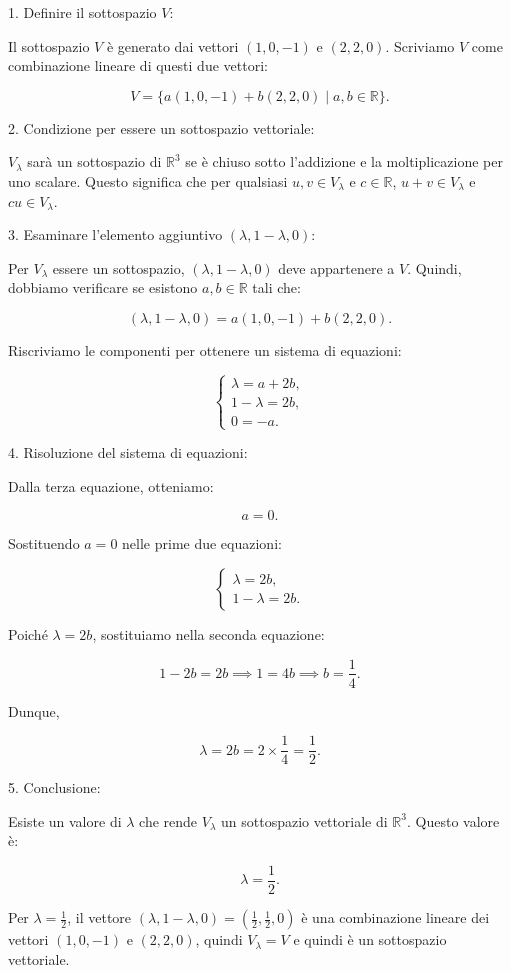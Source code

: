 \documentclass[12pt, a4paper, openany]{book}
\begin{document}
1. Definire il sottospazio \( V \):

   Il sottospazio \( V \) è generato dai vettori \( (1, 0, -1) \) e \( (2, 2, 0) \). Scriviamo \( V \) come combinazione lineare di questi due vettori:

   \[
   V = \{ a(1, 0, -1) + b(2, 2, 0) \mid a, b \in \mathbb{R} \}.
   \]

2. Condizione per essere un sottospazio vettoriale:

   \( V_{\lambda} \) sarà un sottospazio di \( \mathbb{R}^3 \) se è chiuso sotto l'addizione e la moltiplicazione per uno scalare. Questo significa che per qualsiasi \( u, v \in V_{\lambda} \) e \( c \in \mathbb{R} \), \( u + v \in V_{\lambda} \) e \( cu \in V_{\lambda} \).

3. Esaminare l'elemento aggiuntivo \( (\lambda, 1 - \lambda, 0) \):

   Per \( V_{\lambda} \) essere un sottospazio, \( (\lambda, 1 - \lambda, 0) \) deve appartenere a \( V \). Quindi, dobbiamo verificare se esistono \( a, b \in \mathbb{R} \) tali che:

   \[
   (\lambda, 1 - \lambda, 0) = a(1, 0, -1) + b(2, 2, 0).
   \]

   Riscriviamo le componenti per ottenere un sistema di equazioni:

   \[
   \begin{cases}
   \lambda = a + 2b, \\
   1 - \lambda = 2b, \\
   0 = -a.
   \end{cases}
   \]

4. Risoluzione del sistema di equazioni:

   Dalla terza equazione, otteniamo:

   \[
   a = 0.
   \]

   Sostituendo \( a = 0 \) nelle prime due equazioni:

   \[
   \begin{cases}
   \lambda = 2b, \\
   1 - \lambda = 2b.
   \end{cases}
   \]

   Poiché \( \lambda = 2b \), sostituiamo nella seconda equazione:

   \[
   1 - 2b = 2b \implies 1 = 4b \implies b = \frac{1}{4}.
   \]

   Dunque,

   \[
   \lambda = 2b = 2 \times \frac{1}{4} = \frac{1}{2}.
   \]

5. Conclusione:

   Esiste un valore di \( \lambda \) che rende \( V_{\lambda} \) un sottospazio vettoriale di \( \mathbb{R}^3 \). Questo valore è:

   \[
   \lambda = \frac{1}{2}.
   \]

   Per \( \lambda = \frac{1}{2} \), il vettore \( (\lambda, 1 - \lambda, 0) = \left(\frac{1}{2}, \frac{1}{2}, 0\right) \) è una combinazione lineare dei vettori \( (1, 0, -1) \) e \( (2, 2, 0) \), quindi \( V_{\lambda} = V \) e quindi è un sottospazio vettoriale.
\end{document}
